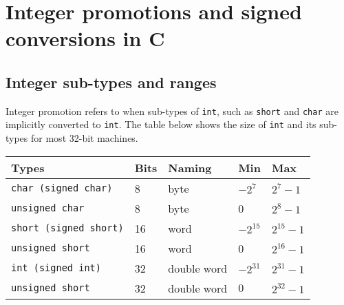 \documentclass[a4paper]{article}
\begin{document}






\newpage
\tableofcontents
\newpage



\section{Integer promotions and signed conversions in C}



\subsection{Integer sub-types and ranges}

Integer promotion refers to when sub-types of \texttt{int}, such as \texttt{short} and \texttt{char} are implicitly converted to \texttt{int}. The table below shows the size of \texttt{int} and its sub-types for most 32-bit machines.

\begin{tabular}{p{}p{}p{}p{}p{}} \toprule %
{Types} & {Bits} & {Naming} & {Min} &{Max} \\ \midrule
    \texttt{char (signed char)} & 8 & byte & $-2^7$ & $2^7-1$\\
    \texttt{unsigned char} &  8 & byte &0 & $2^8-1$\\
    \texttt{short (signed short)} &  16 & word & $-2^{15}$ & $2^{15}-1$\\
    \texttt{unsigned short} &  16 & word & 0 & $2^{16}-1$\\
    \texttt{int (signed int)} &  32 & double word & $-2^{31}$ & $2^{31}-1$\\
    \texttt{unsigned short} &  32 & double word & $0$ & $2^{32}-1$\\
    \bottomrule
\end{tabular}
\end{document}
